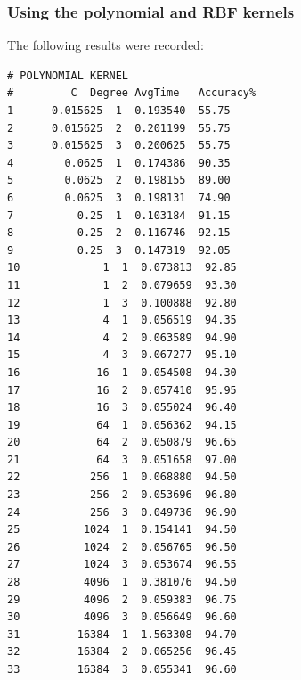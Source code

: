 \documentclass[letterpaper,doc,notimes]{apa6}
\begin{document}
\subsubsection{Using the polynomial and RBF kernels} 
The following results were recorded:
\begin{verbatim}
# POLYNOMIAL KERNEL
#         C  Degree AvgTime   Accuracy%
1      0.015625  1  0.193540  55.75
2      0.015625  2  0.201199  55.75
3      0.015625  3  0.200625  55.75
4        0.0625  1  0.174386  90.35
5        0.0625  2  0.198155  89.00
6        0.0625  3  0.198131  74.90
7          0.25  1  0.103184  91.15
8          0.25  2  0.116746  92.15
9          0.25  3  0.147319  92.05
10             1  1  0.073813  92.85
11             1  2  0.079659  93.30
12             1  3  0.100888  92.80
13             4  1  0.056519  94.35
14             4  2  0.063589  94.90
15             4  3  0.067277  95.10
16            16  1  0.054508  94.30
17            16  2  0.057410  95.95
18            16  3  0.055024  96.40
19            64  1  0.056362  94.15
20            64  2  0.050879  96.65
21            64  3  0.051658  97.00
22           256  1  0.068880  94.50
23           256  2  0.053696  96.80
24           256  3  0.049736  96.90
25          1024  1  0.154141  94.50
26          1024  2  0.056765  96.50
27          1024  3  0.053674  96.55
28          4096  1  0.381076  94.50
29          4096  2  0.059383  96.75
30          4096  3  0.056649  96.60
31         16384  1  1.563308  94.70
32         16384  2  0.065256  96.45
33         16384  3  0.055341  96.60


\end{verbatim}
\end{document}
